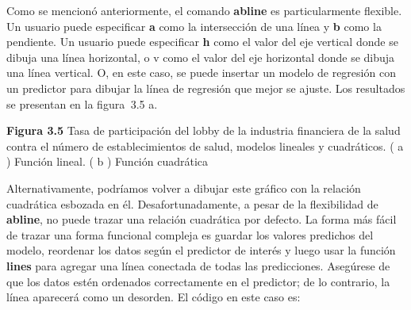 \documentclass[
]{book}
\newenvironment{Shaded}{\begin{snugshade}}{\end{snugshade}}
\newcommand{\AttributeTok}[1]{\textcolor[rgb]{0.77,0.63,0.00}{#1}}
\newcommand{\FunctionTok}[1]{\textcolor[rgb]{0.00,0.00,0.00}{#1}}
\newcommand{\NormalTok}[1]{#1}
\newcommand{\SpecialCharTok}[1]{\textcolor[rgb]{0.00,0.00,0.00}{#1}}
\newcommand{\StringTok}[1]{\textcolor[rgb]{0.31,0.60,0.02}{#1}}
\begin{document}
\begin{Shaded}
\end{Shaded}

Como se mencionó anteriormente, el comando \textbf{abline} es particularmente flexible. Un usuario puede especificar \textbf{a} como la intersección de una línea y \textbf{b} como la pendiente. Un usuario puede especificar \textbf{h} como el valor del eje vertical donde se dibuja una línea horizontal, o v como el valor del eje horizontal donde se dibuja una línea vertical. O, en este caso, se puede insertar un modelo de regresión con un predictor para dibujar la línea de regresión que mejor se ajuste. Los resultados se presentan en la figura  3.5 a.

\textbf{Figura 3.5} Tasa de participación del lobby de la industria financiera de la salud contra el número de establecimientos de salud, modelos lineales y cuadráticos. ( a ) Función lineal. ( b ) Función cuadrática

Alternativamente, podríamos volver a dibujar este gráfico con la relación cuadrática esbozada en él. Desafortunadamente, a pesar de la flexibilidad de \textbf{abline}, no puede trazar una relación cuadrática por defecto. La forma más fácil de trazar una forma funcional compleja es guardar los valores predichos del modelo, reordenar los datos según el predictor de interés y luego usar la función \textbf{lines} para agregar una línea conectada de todas las predicciones. Asegúrese de que los datos estén ordenados correctamente en el predictor; de lo contrario, la línea aparecerá como un desorden. El código en este caso es:
\end{document}
